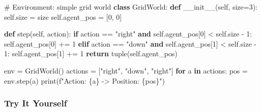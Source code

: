 \documentclass[
  letterpaper,
  DIV=11,
  numbers=noendperiod]{scrreprt}
\newenvironment{Shaded}{\begin{snugshade}}{\end{snugshade}}
\newcommand{\BuiltInTok}[1]{\textcolor[rgb]{0.00,0.23,0.31}{#1}}
\newcommand{\CommentTok}[1]{\textcolor[rgb]{0.37,0.37,0.37}{#1}}
\newcommand{\ControlFlowTok}[1]{\textcolor[rgb]{0.00,0.23,0.31}{\textbf{#1}}}
\newcommand{\DecValTok}[1]{\textcolor[rgb]{0.68,0.00,0.00}{#1}}
\newcommand{\FunctionTok}[1]{\textcolor[rgb]{0.28,0.35,0.67}{#1}}
\newcommand{\KeywordTok}[1]{\textcolor[rgb]{0.00,0.23,0.31}{\textbf{#1}}}
\newcommand{\NormalTok}[1]{\textcolor[rgb]{0.00,0.23,0.31}{#1}}
\newcommand{\OperatorTok}[1]{\textcolor[rgb]{0.37,0.37,0.37}{#1}}
\newcommand{\SpecialCharTok}[1]{\textcolor[rgb]{0.37,0.37,0.37}{#1}}
\newcommand{\SpecialStringTok}[1]{\textcolor[rgb]{0.13,0.47,0.30}{#1}}
\newcommand{\StringTok}[1]{\textcolor[rgb]{0.13,0.47,0.30}{#1}}
\newcommand{\VariableTok}[1]{\textcolor[rgb]{0.07,0.07,0.07}{#1}}
\begin{document}
\begin{Shaded}
\begin{Highlighting}[]
\CommentTok{\# Environment: simple grid world}
\KeywordTok{class}\NormalTok{ GridWorld:}
    \KeywordTok{def} \FunctionTok{\_\_init\_\_}\NormalTok{(}\VariableTok{self}\NormalTok{, size}\OperatorTok{=}\DecValTok{3}\NormalTok{):}
        \VariableTok{self}\NormalTok{.size }\OperatorTok{=}\NormalTok{ size}
        \VariableTok{self}\NormalTok{.agent\_pos }\OperatorTok{=}\NormalTok{ [}\DecValTok{0}\NormalTok{, }\DecValTok{0}\NormalTok{]}
    
    \KeywordTok{def}\NormalTok{ step(}\VariableTok{self}\NormalTok{, action):}
        \ControlFlowTok{if}\NormalTok{ action }\OperatorTok{==} \StringTok{"right"} \KeywordTok{and} \VariableTok{self}\NormalTok{.agent\_pos[}\DecValTok{0}\NormalTok{] }\OperatorTok{\textless{}} \VariableTok{self}\NormalTok{.size }\OperatorTok{{-}} \DecValTok{1}\NormalTok{:}
            \VariableTok{self}\NormalTok{.agent\_pos[}\DecValTok{0}\NormalTok{] }\OperatorTok{+=} \DecValTok{1}
        \ControlFlowTok{elif}\NormalTok{ action }\OperatorTok{==} \StringTok{"down"} \KeywordTok{and} \VariableTok{self}\NormalTok{.agent\_pos[}\DecValTok{1}\NormalTok{] }\OperatorTok{\textless{}} \VariableTok{self}\NormalTok{.size }\OperatorTok{{-}} \DecValTok{1}\NormalTok{:}
            \VariableTok{self}\NormalTok{.agent\_pos[}\DecValTok{1}\NormalTok{] }\OperatorTok{+=} \DecValTok{1}
        \ControlFlowTok{return} \BuiltInTok{tuple}\NormalTok{(}\VariableTok{self}\NormalTok{.agent\_pos)}

\NormalTok{env }\OperatorTok{=}\NormalTok{ GridWorld()}
\NormalTok{actions }\OperatorTok{=}\NormalTok{ [}\StringTok{"right"}\NormalTok{, }\StringTok{"down"}\NormalTok{, }\StringTok{"right"}\NormalTok{]}
\ControlFlowTok{for}\NormalTok{ a }\KeywordTok{in}\NormalTok{ actions:}
\NormalTok{    pos }\OperatorTok{=}\NormalTok{ env.step(a)}
    \BuiltInTok{print}\NormalTok{(}\SpecialStringTok{f"Action: }\SpecialCharTok{\{}\NormalTok{a}\SpecialCharTok{\}}\SpecialStringTok{ {-}\textgreater{} Position: }\SpecialCharTok{\{}\NormalTok{pos}\SpecialCharTok{\}}\SpecialStringTok{"}\NormalTok{)}
\end{Highlighting}
\end{Shaded}

\subsubsection{Try It Yourself}\label{try-it-yourself-2}
\end{document}
